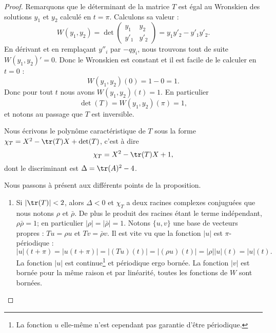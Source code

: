 \begin{proof}
    Remarquons que le déterminant de la matrice \( T\) est égal au Wronskien des solutions \( y_1\) et \( y_2\) calculé en \( t=\pi\). Calculons sa valeur :
    \begin{equation}
        W(y_1,y_2)=\det\begin{pmatrix}
            y_1    &   y_2    \\
            y'_1    &   y'_2
        \end{pmatrix}=y_1y'_2-y'_1y'_2.
    \end{equation}
    En dérivant et en remplaçant \( y''_i\) par \( -qy_i\), nous trouvons tout de suite \( W(y_1,y_2)'=0\). Donc le Wronskien est constant et il est facile de le calculer en \( t=0\) :
    \begin{equation}
        W(y_1,y_2)(0)=1-0=1.
    \end{equation}
    Donc pour tout \( t\) nous avons \( W(y_1,y_2)(t)=1\). En particulier
    \begin{equation}
        \det(T)=W(y_1,y_2)(\pi)=1,
    \end{equation}
    et notons au passage que \( T\) est inversible.

    Nous écrivons le polynôme caractéristique de \( T\) sous la forme \( \chi_T=X^2-\tr(T)X+\det(T)\), c'est à dire
    \begin{equation}
        \chi_T=X^2-\tr(T)X+1,
    \end{equation}
    dont le discriminant est \( \Delta=\tr(A)^2-4\).

    Nous passons à présent aux différents points de la proposition.
    \begin{enumerate}
        \item
            Si \( | \tr(T) |<2\), alors \( \Delta<0\) et \( \chi_T\) a deux racines complexes conjuguées que nous notons \( \rho\) et \( \bar\rho\). De plus le produit des racines étant le terme indépendant, \( \rho\bar\rho=1\); en particulier \( | \rho |=| \bar \rho |=1\). Notons \( \{ u,v \}\) une base de vecteurs propres : \( Tu=\rho u\) et \( Tv=\bar \rho v\). Il est vite vu que la fonction \( | u |\) est \( \pi\)-périodique :
            \begin{equation}
                | u |(t+\pi)=| u(t+\pi) |=| (Tu)(t) |=| (\rho u)(t) |=| \rho | | u |(t)=| u |(t).
            \end{equation}
            La fonction \( | u |\) est continue\footnote{La fonction \( u\) elle-même n'est cependant pas garantie d'être périodique.} et périodique ergo bornée. La fonction \( | v |\) est bornée pour la même raison et par linéarité, toutes les fonctions de \( W\) sont bornées.


\end{enumerate}
\end{proof}
